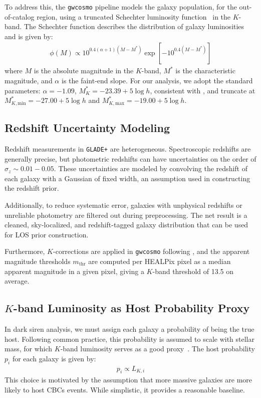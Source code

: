To address this, the \texttt{gwcosmo} pipeline models the galaxy population, for the out-of-catalog region, using a truncated Schechter luminosity function~\citep{schechter1976analytic} in the $K$-band. The Schechter function describes the distribution of galaxy luminosities and is given by:
\begin{align}
    \phi(M) \propto 10^{0.4(\alpha + 1)(M - M^*)} \exp[-10^{0.4(M - M^*)}]
\end{align}
where \( M \) is the absolute magnitude in the $K$-band, $M^*$ is the characteristic magnitude, and $\alpha$ is the faint-end slope. For our analysis, we adopt the standard parameters: $\alpha = -1.09$, $M^*_{K} = -23.39 + 5\log h$, consistent with \citet{kochanek2001k}, and truncate at $M^*_{K,\mathrm{min}} = -27.00 + 5\log h$ and $M^*_{K,\mathrm{max}} = -19.00 + 5\log h$.

\subsection{Redshift Uncertainty Modeling}

Redshift measurements in \texttt{GLADE+} are heterogeneous. Spectroscopic redshifts are generally precise, but photometric redshifts can have uncertainties on the order of $\sigma_z \sim 0.01-0.05$. These uncertainties are modeled by convolving the redshift of each galaxy with a Gaussian of fixed width, an assumption used in constructing the redshift prior.

Additionally, to reduce systematic error, galaxies with unphysical redshifts or unreliable photometry are filtered out during preprocessing. The net result is a cleaned, sky-localized, and redshift-tagged galaxy distribution that can be used for \ac{LOS} prior construction.

Furthermore, $K$-corrections are applied in \texttt{gwcosmo} following \citet{kochanek2001k}, and the apparent magnitude thresholds $m_{\mathrm{thr}}$ are computed per HEALPix pixel as a median apparent magnitude in a given pixel, giving a $K$-band threshold of 13.5 on average.

\subsection{$K$-band Luminosity as Host Probability Proxy}

In dark siren analysis, we must assign each galaxy a probability of being the true host. Following common practice, this probability is assumed to scale with stellar mass, for which $K$-band luminosity serves as a good proxy~\citep{strazzullo2006near,sureshkumar2021galaxy}. The host probability  $p_i$ for each galaxy is given by:
\begin{align}
    p_i \propto L_{K, i}
\end{align}
This choice is motivated by the assumption that more massive galaxies are more likely to host \acp{CBC} events. While simplistic, it provides a reasonable baseline.